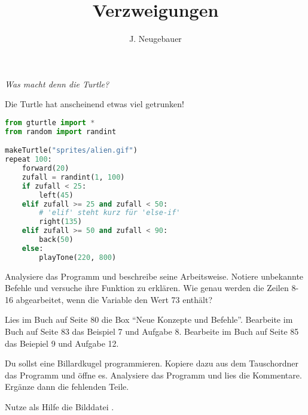 \documentclass[10pt, a4paper]{scrartcl}
\author{J. Neugebauer}
\title{Verzweigungen}
\date{\Heute}
\begin{document}
\ReiheTitel

\begin{aufgabe}
	\emph{Was macht denn die Turtle?}
	
	Die Turtle hat anscheinend etwas viel getrunken! 
	
	\begin{lstlisting}[language=python]
from gturtle import *
from random import randint

makeTurtle("sprites/alien.gif")
repeat 100:
    forward(20)
    zufall = randint(1, 100)
    if zufall < 25:
        left(45)
    elif zufall >= 25 and zufall < 50:
        # 'elif' steht kurz für 'else-if'
        right(135)
    elif zufall >= 50 and zufall < 90:
        back(50)
    else:
        playTone(220, 800)
	\end{lstlisting}
	
	\begin{teilaufgaben}
		\teilaufgabe Analysiere das Programm und beschreibe seine Arbeitsweise. Notiere unbekannte Befehle und versuche ihre Funktion zu erklären.
		\teilaufgabe Wie genau werden die Zeilen 8-16 abgearbeitet, wenn die Variable  den Wert \num{73} enthält?
	\end{teilaufgaben}
\end{aufgabe}
	
	\begin{aufgabe}
		\begin{teilaufgaben}
			\teilaufgabe Lies im Buch auf Seite \num{80} die Box \enquote{Neue Konzepte und Befehle}.
			\teilaufgabe Bearbeite im Buch auf Seite 83 das Beispiel 7 und Aufgabe 8.
			\teilaufgabe Bearbeite im Buch auf Seite 85 das Beiepiel 9 und Aufgabe 12.
		\end{teilaufgaben}
	\end{aufgabe}

	\begin{aufgabe}
		Du sollst eine Billardkugel programmieren. Kopiere dazu aus dem Tauschordner das Programm  und öffne es. Analysiere das Programm und lies die Kommentare. Ergänze dann die fehlenden Teile.
		
		Nutze als Hilfe die Bilddatei \datei{07-Abb\_Arbeitsfläche.png}. 
	\end{aufgabe}
	
\end{document}
